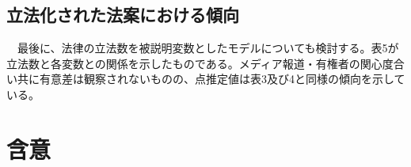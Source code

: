 \documentclass[here]{article}
\begin{document}
\subsection{立法化された法案における傾向}
　最後に、法律の立法数を被説明変数としたモデルについても検討する。表5が立法数と各変数との関係を示したものである。メディア報道・有権者の関心度合い共に有意差は観察されないものの、点推定値は表3及び4と同様の傾向を示している。\\



\section{含意}

\newpage

\end{document}
